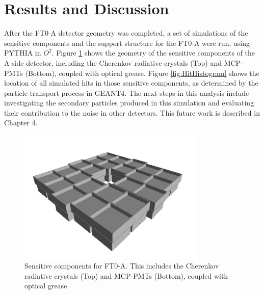 \section{Results and Discussion}

After the FT0-A detector geometry was completed, a set of simulations of the sensitive components and the support structure for the FT0-A were run, using PYTHIA \cite{PYTHIA} in $O^2$.  Figure \ref{fig:FT0A-SensitiveComponents} shows the geometry of the sensitive components of the A-side detector, including the Cherenkov radiative crystals (Top) and MCP-PMTs (Bottom), coupled with optical grease.  Figure \ref{fig:HitHistogram} shows the location of all simulated hits in those sensitive components, as determined by the particle transport process in GEANT4. The next steps in this analysis include investigating the secondary particles produced in this simulation and evaluating their contribution to the noise in other detectors. This future work is described in Chapter 4.


\begin{figure}[H]
    \centering
    \includegraphics[width=0.8\textwidth]{figures/FIT/T0+_Sensitive_Components.png}
    \caption{Sensitive components for FT0-A. This includes the Cherenkov radiative crystals (Top) and MCP-PMTs (Bottom), coupled with optical grease}
    \label{fig:FT0A-SensitiveComponents}
\end{figure}

